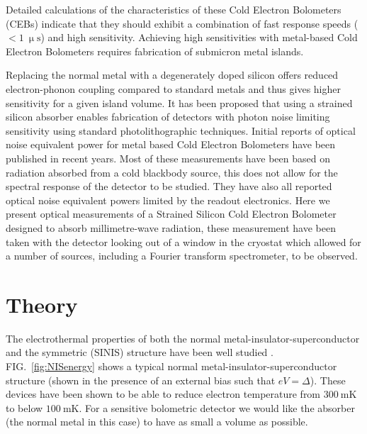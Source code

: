 \documentclass[aip, apl, a4paper, amsmath,amssymb, reprint]{revtex4-1}
\begin{document}
Detailed calculations of the characteristics of these Cold Electron Bolometers (CEBs) indicate that they should exhibit a combination of fast response speeds ($<1~\mathrm{\upmu s}$) and high sensitivity. Achieving high sensitivities with metal-based Cold Electron Bolometers requires fabrication of submicron metal islands. 

Replacing the normal metal with a degenerately doped silicon offers reduced electron-phonon coupling compared to standard metals and thus gives higher sensitivity for a given island volume\cite{Leoni99}. It has been proposed\cite{Muhonen2011} that using a strained silicon absorber enables fabrication of detectors with photon noise limiting sensitivity using standard photolithographic techniques. Initial reports of optical noise equivalent power for metal based Cold Electron Bolometers have been published in recent years\cite{Otto2013, Tarasov2011}. Most of these measurements have been based on radiation absorbed from a cold blackbody source, this does not allow for the spectral response of the detector to be studied. They have also all reported optical noise equivalent powers limited by the readout electronics. Here we present optical measurements of a Strained Silicon Cold Electron Bolometer designed to absorb millimetre-wave radiation, these measurement have been taken with the detector looking out of a window in the cryostat which allowed for a number of sources, including a Fourier transform spectrometer, to be observed.

\section{Theory} \label{sec:Theory} 
The electrothermal properties of both the normal metal-insulator-superconductor and the symmetric (SINIS) structure have been well studied \cite{Pekola05, Nahum93, Nahum94, Leivo96, Savin01, Pekola04}. FIG.~\ref{fig:NISenergy} shows a typical normal metal-insulator-superconductor structure (shown in the presence of an external bias such that $eV = \Delta$). These devices have been shown\cite{Pekola04} to be able to reduce electron temperature from $300~\mathrm{mK}$ to below $100~\mathrm{mK}$. For a sensitive bolometric detector we would like the absorber (the normal metal in this case) to have as small a volume as possible.
\end{document}
